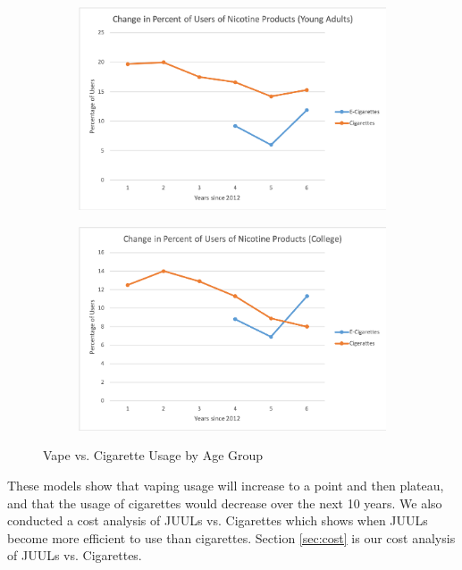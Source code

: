 \documentclass[12pt,letterpaper]{article}
\begin{document}
\begin{figure}[H]
  \begin{subfigure}[t]{.4\linewidth}
  \includegraphics[width=\linewidth]{percentUsersYA}
  \end{subfigure}
  \begin{subfigure}[t]{.4\linewidth}
  \includegraphics[width=\linewidth]{percentUsersCo}
  \end{subfigure}
  \caption{Vape vs. Cigarette Usage by Age Group \citep{noauthor_college-age_2018}}
  \label{fig:cigusage}
\end{figure}

These models show that vaping usage will increase to a point and then plateau, and that the usage of cigarettes would decrease over the next 10 years. We also conducted a cost analysis of JUULs vs. Cigarettes which shows when JUULs become more efficient to use than cigarettes. Section \ref{sec:cost} is our cost analysis of JUULs vs. Cigarettes.
\end{document}
